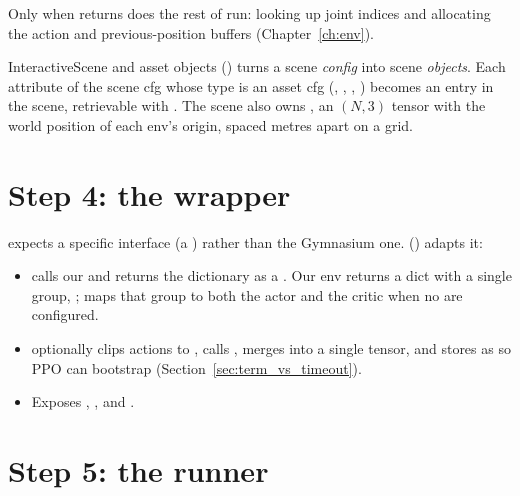 Only when  returns does the rest of
 run: looking up joint indices and allocating the
action and previous-position buffers (Chapter~\ref{ch:env}).

\begin{isaacbox}{InteractiveScene and asset objects}
 ()
turns a scene \emph{config} into scene \emph{objects}. Each attribute of the
scene cfg whose type is an asset cfg (,
, , ) becomes an
entry in the scene, retrievable with . The scene also owns
, an $(N,3)$ tensor with the world position of each env's
origin, spaced  metres apart on a grid.
\end{isaacbox}

\section{Step 4: the wrapper}

 expects a specific interface (a ) rather than the
Gymnasium one. 
() adapts it:

\begin{itemize}[leftmargin=1.6em]
  \item {} calls our  and
        returns the dictionary as a . Our env returns a
        dict with a single group, ;  maps that
        group to both the actor and the critic when no  are
        configured.
  \item {} optionally clips actions to
        , calls , merges
         into a single  tensor, and
        stores  as  so PPO can
        bootstrap (Section~\ref{sec:term_vs_timeout}).
  \item Exposes , , 
        and .
\end{itemize}

\section{Step 5: the runner}

